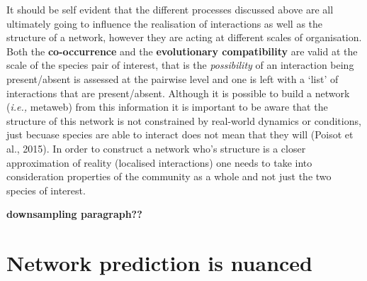 \documentclass[
]{article}
\begin{document}
It should be self evident that the different processes discussed above
are all ultimately going to influence the realisation of interactions as
well as the structure of a network, however they are acting at different
scales of organisation. Both the \textbf{co-occurrence} and the
\textbf{evolutionary compatibility} are valid at the scale of the
species pair of interest, that is the \emph{possibility} of an
interaction being present/absent is assessed at the pairwise level and
one is left with a `list' of interactions that are present/absent.
Although it is possible to build a network (\emph{i.e.,} metaweb) from
this information it is important to be aware that the structure of this
network is not constrained by real-world dynamics or conditions, just
becuase species are able to interact does not mean that they will
(Poisot et al., 2015). In order to construct a network who's structure
is a closer approximation of reality (localised interactions) one needs
to take into consideration properties of the community as a whole and
not just the two species of interest.

\textbf{downsampling paragraph??}

\section{Network prediction is
nuanced}\label{network-prediction-is-nuanced}
\end{document}
